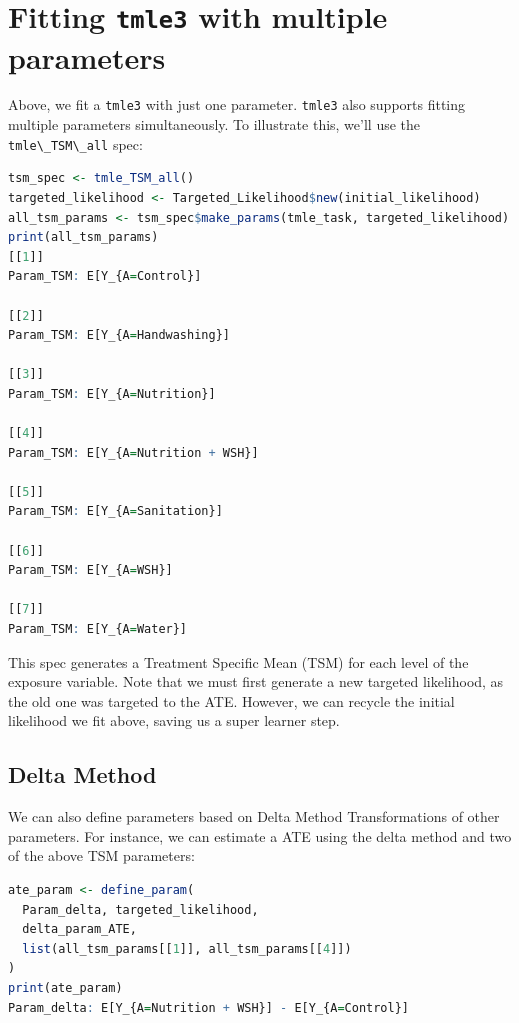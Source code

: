 \documentclass[
  12pt, krantz2,
]{krantz}
\newcommand{\passthrough}[1]{#1}
\newcommand{\1}{\mathbbm{1}}
\theoremstyle{definition}
\theoremstyle{definition}
\theoremstyle{definition}
\theoremstyle{definition}
\theoremstyle{remark}
\begin{document}
\hypertarget{fitting-tmle3-with-multiple-parameters}{%
\section{\texorpdfstring{Fitting \texttt{tmle3} with multiple parameters}{Fitting tmle3 with multiple parameters}}\label{fitting-tmle3-with-multiple-parameters}}

Above, we fit a \passthrough{\lstinline!tmle3!} with just one parameter. \passthrough{\lstinline!tmle3!} also supports fitting
multiple parameters simultaneously. To illustrate this, we'll use the
\passthrough{\lstinline!tmle\_TSM\_all!} spec:

\begin{lstlisting}[language=R]
tsm_spec <- tmle_TSM_all()
targeted_likelihood <- Targeted_Likelihood$new(initial_likelihood)
all_tsm_params <- tsm_spec$make_params(tmle_task, targeted_likelihood)
print(all_tsm_params)
[[1]]
Param_TSM: E[Y_{A=Control}]

[[2]]
Param_TSM: E[Y_{A=Handwashing}]

[[3]]
Param_TSM: E[Y_{A=Nutrition}]

[[4]]
Param_TSM: E[Y_{A=Nutrition + WSH}]

[[5]]
Param_TSM: E[Y_{A=Sanitation}]

[[6]]
Param_TSM: E[Y_{A=WSH}]

[[7]]
Param_TSM: E[Y_{A=Water}]
\end{lstlisting}

This spec generates a Treatment Specific Mean (TSM) for each level of the
exposure variable. Note that we must first generate a new targeted likelihood,
as the old one was targeted to the ATE. However, we can recycle the initial
likelihood we fit above, saving us a super learner step.

\hypertarget{delta-method}{%
\subsection{Delta Method}\label{delta-method}}

We can also define parameters based on Delta Method Transformations of other
parameters. For instance, we can estimate a ATE using the delta method and two
of the above TSM parameters:

\begin{lstlisting}[language=R]
ate_param <- define_param(
  Param_delta, targeted_likelihood,
  delta_param_ATE,
  list(all_tsm_params[[1]], all_tsm_params[[4]])
)
print(ate_param)
Param_delta: E[Y_{A=Nutrition + WSH}] - E[Y_{A=Control}]
\end{lstlisting}
\end{document}
